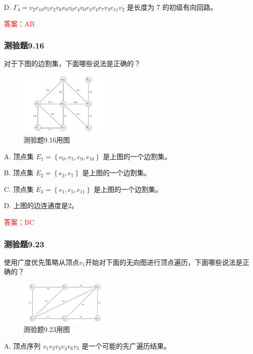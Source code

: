 \documentclass[UTF8, heading=true]{ctexart}
\begin{document}
D. $\Gamma_4=v_2 e_{10} v_5 e_2 v_6 e_9 v_0 e_4 v_0 e_3 v_4 e_7 v_3 e_{11} v_2$ 是长度为 7 的初级有向回路。

\textcolor{red}{答案：AB}

\subsubsection{测验题9.16}

对于下图的边割集，下面哪些说法是正确的？

\begin{figure}[htbp]
    \centering
    \includegraphics[width=0.4\textwidth]{9.16.jpg} %
    \caption{测验题9.16用图}
\end{figure}

A. 顶点集 $E_1=\left\{e_0, e_5, e_9, e_{10}\right\}$ 是上图的一个边割集。

B. 顶点集 $E_2=\left\{e_2, e_7\right\}$ 是上图的一个边割集。

C. 顶点集 $E_3=\left\{e_1, e_5, e_{11}\right\}$ 是上图的一个边割集。

D. 上图的边连通度是2。

\textcolor{red}{答案：BC}

\subsubsection{测验题9.23}

使用广度优先策略从顶点$v_1$开始对下面的无向图进行顶点遍历，下面哪些说法是正确的？

\begin{figure}[htbp]
  \centering
  \includegraphics[width=0.4\textwidth]{9.23.jpg} %
  \caption{测验题9.23用图}
\end{figure}


A. 顶点序列 $v_1 v_2 v_3 v_4 v_6 v_5$ 是一个可能的先广遍历结果。
\end{document}
